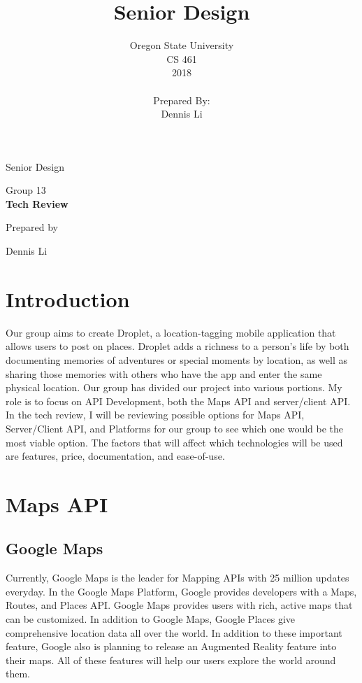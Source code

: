 \documentclass[draftclsnofoot, onecolumn, compsoc, 10pt]{IEEEtran}
\title{Senior Design}
\author{Oregon State University\\CS 461\\2018\\\\Prepared By:\\Dennis Li\\}
\def \CapstoneTeamNumber{		Dennis Li	}
\def \CapstoneProjectName{		Tech Review }
\begin{document}
\begin{titlepage}
    \begin{singlespace}
        \hfill
        \par\vspace{.2in}
        \centering
        \scshape{
            \huge Senior Design\par
            Group 13\\
            \vspace{1in}
            \textbf{\Huge\CapstoneProjectName}\par
            \vspace{1in}
            {\large Prepared by }\par
            \CapstoneTeamNumber\par
            \vspace{5pt}
            \vspace{20pt}
        }
        \vfill
    \end{singlespace}
\end{titlepage}
\newpage
{}
\clearpage
\pagebreak


\section{Introduction}
Our group aims to create Droplet, a location-tagging mobile application that allows users to post on places. Droplet adds a richness to a person’s life by both documenting memories of adventures or special moments by location, as well as sharing those memories with others who have the app and enter the same physical location. Our group has divided our project into various portions. My role is to focus on API Development, both the Maps API and server/client API. In the tech review, I will be reviewing possible options for Maps API, Server/Client API, and Platforms for our group to see which one would be the most viable option. The factors that will affect which technologies will be used are features, price, documentation, and ease-of-use.  


		
\section{Maps API}    

	\subsection{Google Maps}
    Currently, Google Maps is the leader for Mapping APIs with 25 million updates everyday. In the Google Maps Platform, Google provides developers with a Maps, Routes, and Places API. Google Maps provides users with rich, active maps that can be customized. In addition to Google Maps, Google Places give comprehensive location data all over the world. In addition to these important feature, Google also is planning to release an Augmented Reality feature into their maps. All of these features will help our users explore the world around them. 
    
\end{document}
